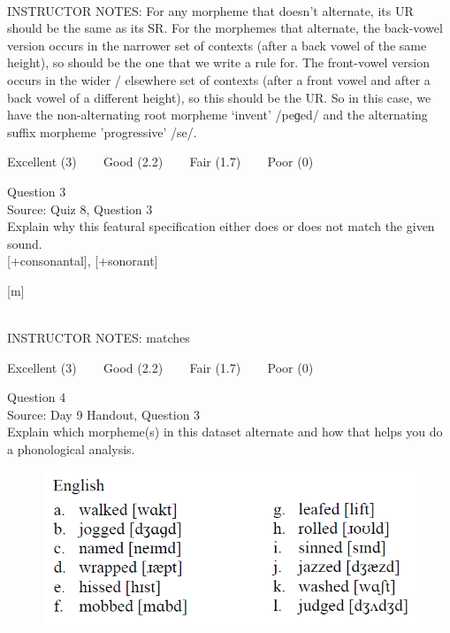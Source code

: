 \documentclass[12pt]{article}
\begin{document}
~\\
INSTRUCTOR NOTES: For any morpheme that doesn’t alternate, its UR should be the same as its SR.  For the morphemes that alternate, the back-vowel version occurs in the narrower set of contexts (after a back vowel of the same height), so should be the one that we write a rule for. The front-vowel version occurs in the wider / elsewhere set of contexts (after a front vowel and after a back vowel of a different height), so this should be the UR. So in this case, we have the non-alternating root morpheme ‘invent’ /peɡed/ and the alternating suffix morpheme 'progressive' /se/.


\vfill
Excellent (3) ~~~ Good (2.2) ~~~ Fair (1.7) ~~~ Poor (0)
\newpage

{\large Question 3}\\

Source: Quiz 8, Question 3\\

Explain why this featural specification either does or does not match the given sound.\\

{[+consonantal]}, {[+sonorant]}

{[m]}


~\\
INSTRUCTOR NOTES: matches


\vfill
Excellent (3) ~~~ Good (2.2) ~~~ Fair (1.7) ~~~ Poor (0)
\newpage

{\large Question 4}\\

Source: Day 9 Handout, Question 3\\

Explain which morpheme(s) in this dataset alternate and how that helps you do a phonological analysis.\\

\begin{figure}[H]
\includegraphics{../images/english_past.png}
\end{figure}
\end{document}
